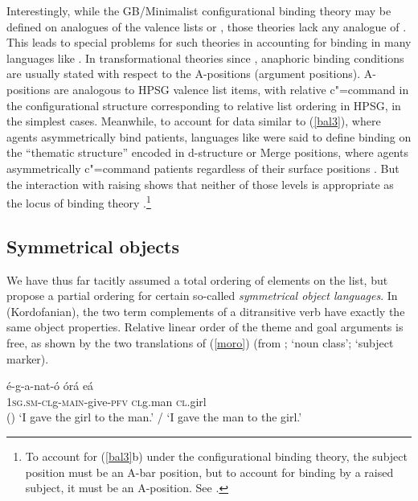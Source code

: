 \documentclass[output=paper
 	        ,biblatex
                ,babelshorthands
                ,newtxmath
                ,draftmode
                ,colorlinks, citecolor=brown
]{langscibook}
\begin{document}
Interestingly, while the GB/Minimalist configurational binding theory may be defined on analogues of
the valence lists or \content, those theories lack any analogue of \argst.  This leads to special problems for
such theories in accounting for binding in many  languages like .
In transformational theories since \citet{Chomsky:1981}, anaphoric binding conditions are usually
stated with respect to the A-positions (argument positions).  A-positions are analogous to HPSG
valence list items, with relative c"=command in the configurational structure corresponding to relative
list ordering in HPSG, in the simplest cases.  Meanwhile, to account for data similar to
(\ref{bal3}), where agents asymmetrically bind patients,  languages like
 were said to define binding on the ``thematic structure'' encoded in d-structure or
Merge positions, where agents asymmetrically c"=command patients regardless of their surface
positions \citep{Guilfoyle+etal:1992}.  But the interaction with raising shows that neither of those
levels is appropriate as the locus of binding theory \citep{Wechsler1999}.\footnote{To account for
  (\ref{bal3}b) under the configurational binding theory, the subject position must be an A-bar
  position, but to account for binding by a raised subject, it must be an A-position.  See
  \citet{Wechsler1999}. }
%

\subsection{Symmetrical objects}

We have thus far tacitly assumed a total ordering of elements on the \argst list, but
\citet*{AMM2013a,Ackermanetal2017} propose a partial ordering  for certain so-called \emph{symmetrical object languages}.  In  (Kordofanian), the
two term complements of a ditransitive verb have exactly the same object
properties.  Relative linear order of the theme and goal arguments is free, as shown by the two
translations of (\ref{moro}) (from \citealt[9]{Ackermanetal2017};  `noun class'; 
`subject marker).


\begin{exe}
	\ex\label{moro}
\gll   \'{e}-g-a-nat-\'{o} \'{o}r\'{a}  e\'{a}  \\
        1\textsc{sg.sm-cl}g-\textsc{main}-give-\textsc{pfv}    \textsc{cl}g.man \textsc{cl}.girl \\\hfill()
\glt `I gave the girl to the man.’ / `I gave the man to the girl.’
\end{exe} 
\end{document}
